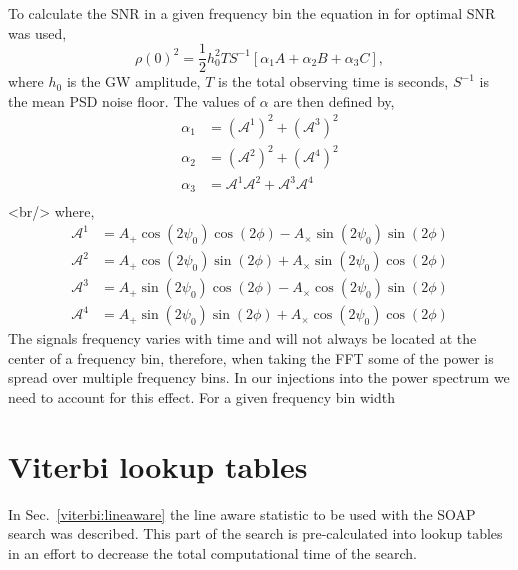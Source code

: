 To calculate the \ac{SNR} in a given frequency bin the equation in \cite{Prix2007} for optimal \ac{SNR} was used,
\begin{equation}
    \rho(0)^2 = \frac{1}{2}h_0^2 T S^{-1} \left[ \alpha_1 A + \alpha_2 B + \alpha_3 C \right],
\end{equation}
where $h_0$ is the \ac{GW} amplitude, $T$ is the total observing time is seconds, $S^{-1}$ is the mean \ac{PSD} noise floor. The values of $\alpha$ are then defined by,
\begin{equation}
\begin{split}
\alpha_1 &= (\mathcal{A}^1)^2 + (\mathcal{A}^3)^2\\
\alpha_2 &= (\mathcal{A}^2)^2 + (\mathcal{A}^4)^2 \\
\alpha_3 &= \mathcal{A}^1\mathcal{A}^2 + \mathcal{A}^3\mathcal{A}^4 \\
\end{split}
\end{equation}
<br/>
where,
\begin{equation}
\begin{split}
\mathcal{A}^1 &= A_{+}\cos(2\psi_0)\cos(2\phi) - A_{\times}\sin(2\psi_0)\sin(2\phi) \\
\mathcal{A}^2 &= A_{+}\cos(2\psi_0)\sin(2\phi) + A_{\times}\sin(2\psi_0)\cos(2\phi) \\
\mathcal{A}^3 &= A_{+}\sin(2\psi_0)\cos(2\phi) - A_{\times}\cos(2\psi_0)\sin(2\phi) \\
\mathcal{A}^4 &= A_{+}\sin(2\psi_0)\sin(2\phi) + A_{\times}\cos(2\psi_0)\cos(2\phi) 
\end{split}
\end{equation}
The signals frequency varies with time and will not always be located at the center of a frequency bin, therefore, when taking the \ac{FFT} some of the power is spread over multiple frequency bins. 
In our injections into the power spectrum we need to account for this effect. 
For a given frequency bin width 

\section{Viterbi lookup tables}

In Sec.~\ref{viterbi:lineaware} the line aware statistic to be used with the \ac{SOAP} search was described. This part of the search is pre-calculated into lookup tables in an effort to decrease the total computational time of the search. 

